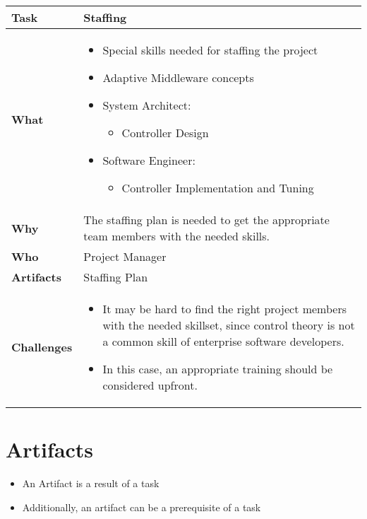 \begin{tabularx}{\textwidth}{@{} l X @{}}
	\caption{Staffing} \label{table:ch6_Task_Staffing}\\
	\toprule 
	\bfseries Task & Staffing\\
	\midrule 
	\bfseries What & 
	\begin{itemize}
		\item Special skills needed for staffing the project
		\item Adaptive Middleware concepts
		\item System Architect:
		\begin{itemize}
			\item Controller Design
		\end{itemize}
		\item Software Engineer:
		\begin{itemize}
			\item Controller Implementation and Tuning
		\end{itemize}
	\end{itemize}
	\\
	\midrule 
	\bfseries Why & The staffing plan is needed to get the appropriate team members with the needed skills.\\
	\midrule 
	\bfseries Who & Project Manager\\
	\midrule 
	\bfseries Artifacts & Staffing Plan\\
	\midrule 
	\bfseries Challenges &
	\begin{itemize}
		\item It may be hard to find the right project members with the needed skillset, since control theory is not a common skill of enterprise software developers. 
		\item In this case, an appropriate training should be considered upfront.
	\end{itemize}
	\\
	\bottomrule 
\end{tabularx}


\section{Artifacts}

\begin{itemize}
	\item An Artifact is a result of a task
	\item Additionally, an artifact can be a prerequisite of a task
\end{itemize}

